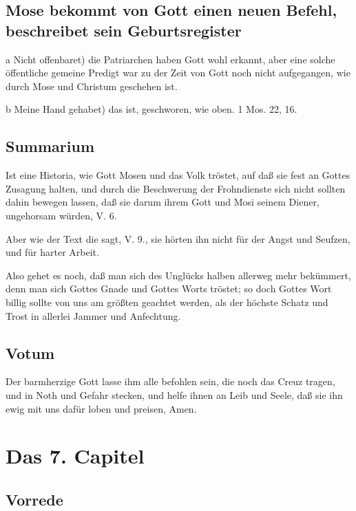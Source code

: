 \section[Mose bekommt von Gott einen neuen Befehl, beschreibet]{Mose bekommt von Gott einen neuen Befehl, beschreibet sein Geburtsregister}

a Nicht offenbaret) die Patriarchen haben Gott wohl erkannt, aber eine solche öffentliche gemeine Predigt war zu der Zeit von Gott noch nicht aufgegangen, wie durch Mose und Christum geschehen ist.

b Meine Hand gehabet) das ist, geschworen, wie oben. 1 Mos. 22, 16.


\section{Summarium}

Ist eine Historia, wie Gott Mosen und das Volk tröstet, auf daß sie fest an Gottes Zusagung halten, und durch die Beschwerung der Frohndienste sich nicht sollten dahin bewegen lassen, daß sie darum ihrem Gott und Mosi seinem Diener, ungehorsam würden, V. 6.

Aber wie der Text die sagt, V. 9., sie hörten ihn nicht für der Angst und Seufzen, und für harter Arbeit.

Also gehet es noch, daß man sich des Unglücks halben allerweg mehr bekümmert, denn man sich Gottes Gnade und Gottes Worts tröstet; so doch Gottes Wort billig sollte von uns am größten geachtet werden, als der höchste Schatz und Trost in allerlei Jammer und Anfechtung.

\section{Votum}

Der barmherzige Gott lasse ihm alle befohlen sein, die noch das Creuz tragen, und in Noth und Gefahr stecken, und helfe ihnen an Leib und Seele, daß sie ihn ewig mit uns dafür loben und preisen, Amen.

\chapter{Das 7. Capitel}

\section{Vorrede}

